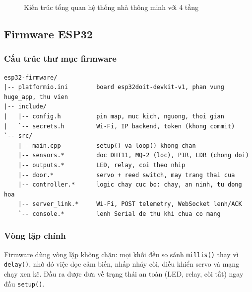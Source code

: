 \documentclass[12pt,a4paper]{extarticle}
\begin{document}
\begin{figure}[!htb]
\caption{Kiến trúc tổng quan hệ thống nhà thông minh với 4 tầng}
\label{fig:kientruc}
\end{figure}

\subsection{Firmware ESP32}
\subsubsection{Cấu trúc thư mục firmware}
\begin{lstlisting}[language={}]
esp32-firmware/
|-- platformio.ini        board esp32doit-devkit-v1, phan vung huge_app, thu vien
|-- include/
|   |-- config.h          pin map, muc kich, nguong, thoi gian
|   `-- secrets.h         Wi-Fi, IP backend, token (khong commit)
`-- src/
    |-- main.cpp          setup() va loop() khong chan
    |-- sensors.*         doc DHT11, MQ-2 (loc), PIR, LDR (chong doi)
    |-- outputs.*         LED, relay, coi theo nhip
    |-- door.*            servo + reed switch, may trang thai cua
    |-- controller.*      logic chay cuc bo: chay, an ninh, tu dong hoa
    |-- server_link.*     Wi-Fi, POST telemetry, WebSocket lenh/ACK
    `-- console.*         lenh Serial de thu khi chua co mang
\end{lstlisting}

\subsubsection{Vòng lặp chính}
Firmware dùng vòng lặp không chặn: mọi khối đều so sánh \texttt{millis()} thay vì \texttt{delay()}, nhờ đó việc đọc cảm biến, nhấp nháy còi, điều khiển servo và mạng chạy xen kẽ. Đầu ra được đưa về trạng thái an toàn (LED, relay, còi tắt) ngay đầu \texttt{setup()}.
\end{document}
